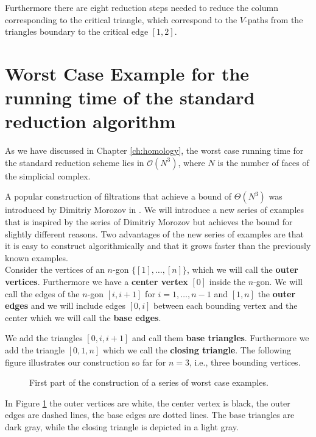 Furthermore there are eight reduction steps needed to reduce the column corresponding to the critical triangle, which correspond to the $V$-paths from the triangles boundary to the critical edge $[1,2]$. 

\section{Worst Case Example for the running time of the standard reduction algorithm}
As we have discussed in Chapter \ref{ch:homology}, the worst case running time for the standard reduction scheme lies in $\mathcal{O}(N^3)$, where $N$ is the number of faces of the simplicial complex.

A popular construction of filtrations that achieve a bound of $\Theta(N^3)$ was introduced by Dimitriy Morozov in \cite{morozov}. We will introduce a new series of examples that is inspired by the series of Dimitriy Morozov but achieves the bound for slightly different reasons. Two advantages of the new series of examples are that it is easy to construct algorithmically and that it grows faster than the previously known examples. \\

Consider the vertices of an $n$-gon $\{[1], \dots, [n] \}$, which we will call the \textbf{outer vertices}. Furthermore we have a \textbf{center vertex} $[0]$ inside the $n$-gon. We will call the edges of the $n$-gon $[i,i+1]$ for $i = 1,\dots,n-1$ and $[1,n]$ the \textbf{outer edges} and we will include edges $[0,i]$ between each bounding vertex and the center which we will call the \textbf{base edges}. 

We add the triangles $[0,i,i+1]$ and call them \textbf{base triangles}. Furthermore we add the triangle $[0,1,n]$ which we call the \textbf{closing triangle}. The following figure illustrates our construction so far for $n=3$, i.e., three bounding vertices.

\begin{figure}[H]
\noindent%
\centering%

\caption{First part of the construction of a series of worst case examples.}
\label{fig:fin_pizza_base}
\end{figure}


In Figure \ref{fig:fin_pizza_base} the outer vertices are white, the center vertex is black, the outer edges are dashed lines, the base edges are dotted lines. The base triangles are dark gray, while the closing triangle is depicted in a light gray. 


